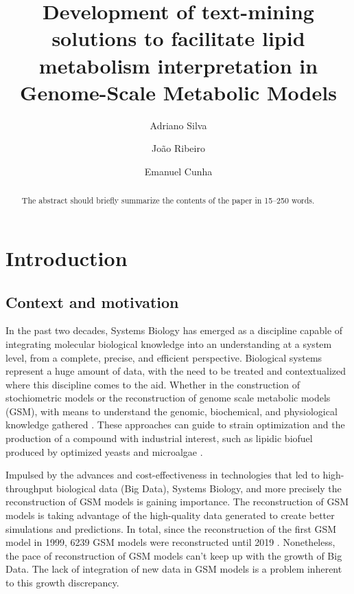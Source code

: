 \documentclass{llncs}
\begin{document}
\pagestyle{myheadings}
\title{Development of text-mining solutions to facilitate lipid metabolism interpretation in Genome-Scale Metabolic Models}

\author{Adriano Silva\and
João Ribeiro\and
Emanuel Cunha}

%
\maketitle              %
%
\begin{abstract}
The abstract should briefly summarize the contents of the paper in
15--250 words.

\end{abstract}
%
%
%
\section{Introduction}
\subsection{Context and motivation}
In the past two decades, Systems Biology has emerged as a discipline capable of integrating molecular biological knowledge into an understanding at a system level, from a complete, precise, and efficient perspective.
Biological systems represent a huge amount of data, with the need to be treated and contextualized where this discipline comes to the aid.  
Whether in the construction of stochiometric models or the reconstruction of genome scale metabolic models (GSM), with means to understand the genomic, biochemical, and physiological knowledge gathered \cite{Zou2018,Tavassoly2018}. 
These approaches can guide to strain optimization and the production of a compound with industrial interest, such as lipidic biofuel produced by optimized yeasts and microalgae \cite{Aung2013}.

Impulsed by the advances and cost-effectiveness in technologies that led to high-throughput biological data (Big Data), Systems Biology, and more precisely the reconstruction of GSM models is gaining importance.
The reconstruction of GSM models is taking advantage of the high-quality data generated to create better simulations and predictions. 
In total, since the reconstruction of the first GSM model in 1999, 6239 GSM models were reconstructed until 2019 \cite{Gu2019}. 
Nonetheless, the pace of reconstruction of GSM models can't keep up with the growth of Big Data. The lack of integration of new data in GSM models is a problem inherent to this growth discrepancy.
\end{document}
